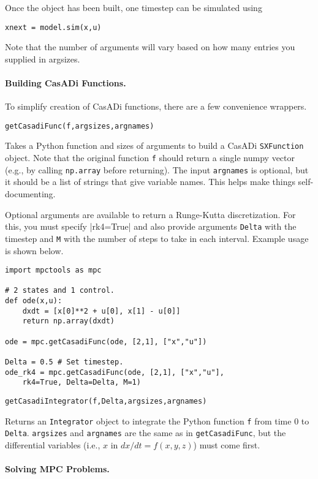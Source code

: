 \documentclass{article}
\providecommand{\lstinline}{}
\newcommand{\funcname}[2][.25em]{\vspace{#1}\noindent\texttt{#2}\nopagebreak\vspace{#1}}
\newcommand{\casadi}{CasADi}
\begin{document}
\begin{multicols}{2}
Once the object has been built, one timestep can be simulated using
\begin{lstlisting}[frame=L]
xnext = model.sim(x,u)
\end{lstlisting}

Note that the number of arguments will vary based on how many entries you supplied in argsizes.

\paragraph*{Building \casadi{} Functions.}

To simplify creation of \casadi{} functions, there are a few convenience wrappers.

\funcname{getCasadiFunc(f,argsizes,argnames)}

Takes a Python function and sizes of arguments to build a \casadi{} \texttt{SXFunction} object.
Note that the original function \texttt{f} should return a single numpy vector (e.g., by calling \texttt{np.array} before returning).
The input \texttt{argnames} is optional, but it should be a list of strings that give variable names.
This helps make things self-documenting.

Optional arguments are available to return a Runge-Kutta discretization.
For this, you must specify \lstinline|rk4=True| and also provide arguments \texttt{Delta} with the timestep and \texttt{M} with the number of steps to take in each interval.
Example usage is shown below.

\begin{lstlisting}[frame=L]
import mpctools as mpc

# 2 states and 1 control.
def ode(x,u):
    dxdt = [x[0]**2 + u[0], x[1] - u[0]]
    return np.array(dxdt)

ode = mpc.getCasadiFunc(ode, [2,1], ["x","u"])

Delta = 0.5 # Set timestep.
ode_rk4 = mpc.getCasadiFunc(ode, [2,1], ["x","u"],
    rk4=True, Delta=Delta, M=1)
\end{lstlisting}

\funcname{getCasadiIntegrator(f,Delta,argsizes,argnames)}

Returns an \texttt{Integrator} object to integrate the Python function \texttt{f} from time 0 to \texttt{Delta}.
\texttt{argsizes} and \texttt{argnames} are the same as in \texttt{getCasadiFunc}, but the differential variables (i.e., $x$ in $dx/dt = f(x,y,z)$) must come first.

\paragraph*{Solving MPC Problems.}


\end{multicols}
\end{document}

